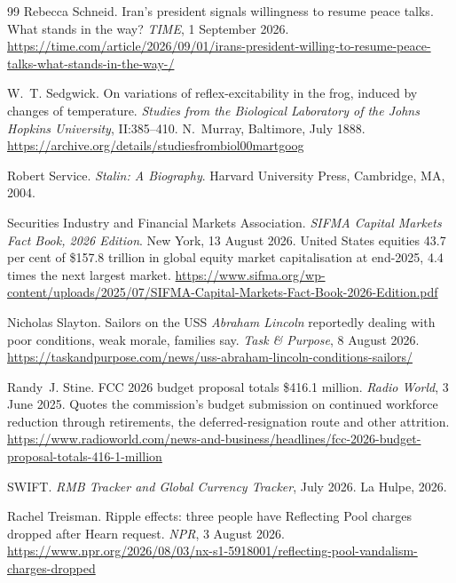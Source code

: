 \documentclass[11pt,a4paper]{article}
\theoremstyle{remark}
\begin{document}
\begin{thebibliography}{99}
Rebecca Schneid.
\newblock Iran's president signals willingness to resume peace talks. What stands in the way?
\newblock \emph{TIME}, 1 September 2026.
\newblock \url{https://time.com/article/2026/09/01/irans-president-willing-to-resume-peace-talks-what-stands-in-the-way-/}


W.~T. Sedgwick.
\newblock On variations of reflex-excitability in the frog, induced by changes of temperature.
\newblock \emph{Studies from the Biological Laboratory of the Johns Hopkins University}, II:385--410.
N.~Murray, Baltimore, July 1888.
\newblock \url{https://archive.org/details/studiesfrombiol00martgoog}

Robert Service.
\newblock \emph{Stalin: A Biography}.
\newblock Harvard University Press, Cambridge, MA, 2004.

Securities Industry and Financial Markets Association.
\newblock \emph{SIFMA Capital Markets Fact Book, 2026 Edition}.
\newblock New York, 13 August 2026. United States equities 43.7 per cent of \$157.8 trillion in global
equity market capitalisation at end-2025, 4.4 times the next largest market.
\newblock \url{https://www.sifma.org/wp-content/uploads/2025/07/SIFMA-Capital-Markets-Fact-Book-2026-Edition.pdf}

Nicholas Slayton.
\newblock Sailors on the USS \emph{Abraham Lincoln} reportedly dealing with poor conditions, weak morale, families say.
\newblock \emph{Task \& Purpose}, 8 August 2026.
\newblock \url{https://taskandpurpose.com/news/uss-abraham-lincoln-conditions-sailors/}

Randy~J. Stine.
\newblock FCC 2026 budget proposal totals \$416.1 million.
\newblock \emph{Radio World}, 3 June 2025. Quotes the commission's budget submission on continued
workforce reduction through retirements, the deferred-resignation route and other attrition.
\newblock \url{https://www.radioworld.com/news-and-business/headlines/fcc-2026-budget-proposal-totals-416-1-million}

SWIFT.
\newblock \emph{RMB Tracker and Global Currency Tracker}, July 2026.
\newblock La Hulpe, 2026.

Rachel Treisman.
\newblock Ripple effects: three people have Reflecting Pool charges dropped after Hearn request.
\newblock \emph{NPR}, 3 August 2026.
\newblock \url{https://www.npr.org/2026/08/03/nx-s1-5918001/reflecting-pool-vandalism-charges-dropped}



\end{thebibliography}
\end{document}
